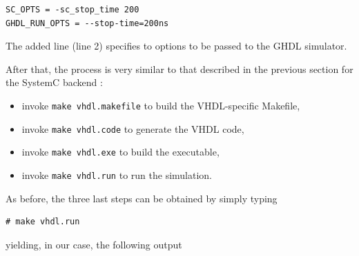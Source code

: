 \begin{lstlisting}[style=MakeStyle,caption={File
    \texttt{simple.proj} for compiling and running SystemC and VHDL code},label={lst:simple-proj-vhdl}]
SC_OPTS = -sc_stop_time 200
GHDL_RUN_OPTS = --stop-time=200ns
\end{lstlisting}

The added line (line 2) specifies to options to be passed to the GHDL simulator. 

\medskip
After that, the process is very similar to that described in the previous section for the SystemC
backend :

\begin{itemize}
\item invoke \verb|make vhdl.makefile| to build the VHDL-specific \textrm{Makefile},
\item invoke \verb|make vhdl.code| to generate the VHDL code,
\item invoke \verb|make vhdl.exe| to build the executable,
\item invoke \verb|make vhdl.run| to run the simulation.
\end{itemize}

As before, the three last steps can be obtained by simply typing 

\begin{lstlisting}[style=BashInputStyle]
# make vhdl.run
\end{lstlisting}

yielding, in our case, the following output 

